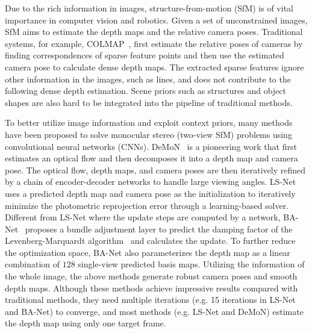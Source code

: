 \documentclass[letterpaper, 10 pt, conference]{ieeeconf}  %
\begin{document}
Due to the rich information in images, structure-from-motion (SfM) is of vital importance in computer vision and robotics. Given a set of unconstrained images, SfM aims to estimate the depth maps and the relative camera poses. Traditional systems, for example, COLMAP~\cite{sfm_revist, schonberger_2016}, first estimate the relative poses of cameras by finding correspondences of sparse feature points and then use the estimated camera pose to calculate dense depth maps. The extracted sparse features ignore other information in the images, such as lines, and does not contribute to the following dense depth estimation. Scene priors such as structures and object shapes are also hard to be integrated into the pipeline of traditional methods.
 
To better utilize image information and exploit context priors, many methods~\cite{demon, ls_net, BA-Net} have been proposed to solve monocular stereo (two-view SfM) problems using convolutional neural networks (CNNs). DeMoN~\cite{demon} is a pioneering work that first estimates an optical flow and then decomposes it into a depth map and camera pose. The optical flow, depth maps, and camera poses are then iteratively refined by a chain of encoder-decoder networks to handle large viewing angles. LS-Net~\cite{ls_net} uses a predicted depth map and camera pose as the initialization to iteratively minimize the photometric reprojection error through a learning-based solver. Different from LS-Net where the update steps are computed by a network, BA-Net~\cite{BA-Net} proposes a bundle adjustment layer to predict the damping factor of the Levenberg-Marquardt algorithm~\cite{numerical_optimization} and calculates the update. To further reduce the optimization space, BA-Net also parameterizes the depth map as a linear combination of $128$ single-view predicted basis maps. Utilizing the information of the whole image, the above methods generate robust camera poses and smooth depth maps. Although these methods achieve impressive results compared with traditional methods, they need multiple iterations (e.g. 15 iterations in LS-Net and BA-Net) to converge, and most methods  (e.g. LS-Net and DeMoN) estimate the depth map using only one target frame.
 
\end{document}
